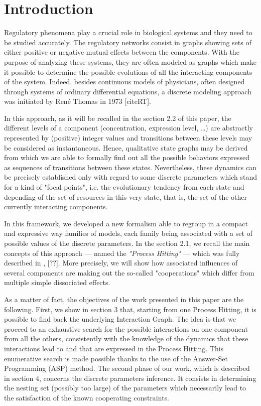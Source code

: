 \section{Introduction}
Regulatory phenomena play a crucial role in biological systems and they need to be studied accurately. The regulatory networks consist in graphs showing sets of either positive or negative mutual effects between the components.
With the purpose of analyzing these systems, they are often modeled as graphs which make it possible to determine the possible evolutions of all the interacting components of the system.
Indeed, besides continuous models of physicians, often designed through systems of ordinary differential equations, a discrete modeling approach was initiated by René Thomas in 1973 [cite{RT}].

In this approach, as it will be recalled in the section 2.2 of this paper, the different levels of a component (concentration, expression level, …) are abstractly represented by (positive) integer values and transitions between these levels may be considered as instantaneous.
Hence, qualitative state graphs may be derived from which we are able to formally find out all the possible behaviors expressed as sequences of transitions between these states.
Nevertheless, these dynamics can be precisely established only with regard to some discrete parameters which stand for a kind of "focal points", i.e. the evolutionary tendency from each state and depending of the set of resources in this very state, that is, the set of the other currently interacting components.

In this framework, we developed a new formalism able to regroup in a compact and expressive way families of models, each family being associated with a set of possible values of the discrete parameters. In the section 2.1, we recall the main concepts of this approach --- named the {\em "Process Hitting"} --- which was fully described in \cite{PMR12-MSCS,PMR10-TCSB}, [??]. More precisely, we will show how associated influences of several components are making out the so-called "cooperations" which differ from multiple simple dissociated effects.

As a matter of fact, the objectives of the work presented in this paper are the following.
First, we show in section 3 that, starting from one Process Hitting, it is possible to find back the underlying Interaction Graph.
The idea is that we proceed to an exhaustive search for the possible interactions on one component from all the others, consistently with the knowledge of the dynamics that these interactions lead to and that are expressed in the Process Hitting.
This enumerative search is made possible thanks to the use of the Answer-Set Programming (ASP) method.
The second phase of our work, which is described in section 4, concerns the discrete parameters inference.
It consists in determining the nesting set (possibly too large) of the parameters which necessarily lead to the satisfaction of the known cooperating constraints.

